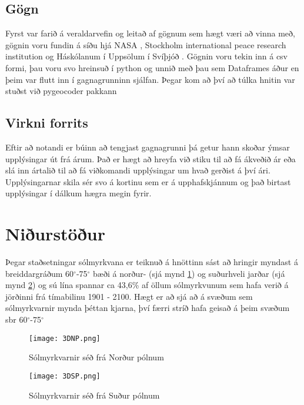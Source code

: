 \documentclass[12pt, git, final]{rureport}
\begin{document}
\subsection{Gögn}
Fyrst var farið á veraldarvefin og leitað af gögnum sem hægt væri að vinna með, gögnin voru fundin á síðu hjá NASA \cite{Eclipse}, Stockholm international peace research institution \cite{weapon} og Háskólanum í Uppsölum í Svíþjóð \cite{conflict}. Gögnin voru tekin inn á csv formi, þau voru svo hreinsuð í python og unnið með þau sem Dataframes áður en þeim var flutt inn í gagnagrunninn sjálfan. Þegar kom að því að túlka hnitin var stuðst við pygeocoder pakkann \cite{geocoder}





\subsection{Virkni forrits}\label{virkni}
Eftir að notandi er búinn að tengjast gagnagrunni þá getur hann skoðar ýmsar upplýsingar út frá árum. Það er hægt að hreyfa við stiku til að fá ákveðið ár eða slá inn ártalið til að fá viðkomandi upplýsingar um hvað gerðist á því ári. Upplýsingarnar skila sér svo á kortinu sem er á upphafskjánnum og það birtast upplýsingar í dálkum hægra megin fyrir. 


\section{Niðurstöður}\label{nidurstodur}

Þegar staðsetningar sólmyrkvana er teiknuð á hnöttinn sást að hringir myndast á breiddargráðum 60$^{\circ}$-75$^{\circ}$ bæði á norður- (sjá mynd \ref{fig:3DNP}) og suðurhveli jarðar (sjá mynd \ref{fig:3DSP}) og sú lína spannar ca 43,6\% af öllum sólmyrkvunum sem hafa verið á jörðinni frá tímabilinu 1901 - 2100. Hægt er að sjá að á svæðum sem sólmyrkvarnir mynda þéttan kjarna, því færri stríð hafa geisað á þeim svæðum sbr 60$^{\circ}$-75$^{\circ}$
\pagebreak

\begin{figure}
	\centering
	\texttt{[image: 3DNP.png]}
	\caption{Sólmyrkvarnir séð frá Norður pólnum}
	\label{fig:3DNP}
\end{figure}

\begin{figure}
	\centering
	\texttt{[image: 3DSP.png]}
	\caption{Sólmyrkvarnir séð frá Suður pólnum}
	\label{fig:3DSP}
\end{figure}
\end{document}
